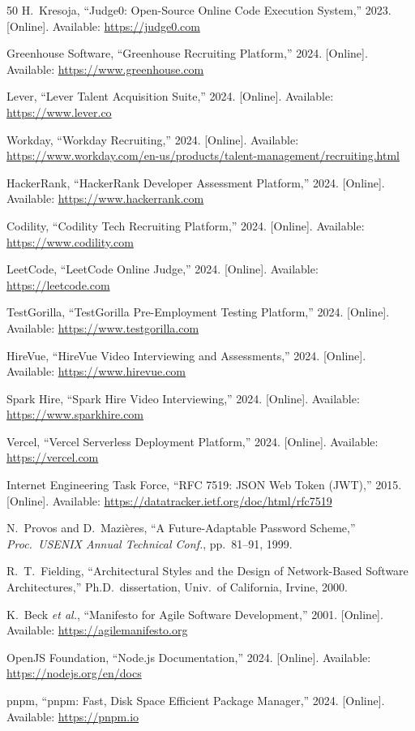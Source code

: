 \begin{thebibliography}{50}
H.~Kresoja, ``Judge0: Open-Source Online Code Execution System,'' 2023. [Online]. Available: \url{https://judge0.com}

Greenhouse Software, ``Greenhouse Recruiting Platform,'' 2024. [Online]. Available: \url{https://www.greenhouse.com}

Lever, ``Lever Talent Acquisition Suite,'' 2024. [Online]. Available: \url{https://www.lever.co}

Workday, ``Workday Recruiting,'' 2024. [Online]. Available: \url{https://www.workday.com/en-us/products/talent-management/recruiting.html}

HackerRank, ``HackerRank Developer Assessment Platform,'' 2024. [Online]. Available: \url{https://www.hackerrank.com}

Codility, ``Codility Tech Recruiting Platform,'' 2024. [Online]. Available: \url{https://www.codility.com}

LeetCode, ``LeetCode Online Judge,'' 2024. [Online]. Available: \url{https://leetcode.com}

TestGorilla, ``TestGorilla Pre-Employment Testing Platform,'' 2024. [Online]. Available: \url{https://www.testgorilla.com}

HireVue, ``HireVue Video Interviewing and Assessments,'' 2024. [Online]. Available: \url{https://www.hirevue.com}

Spark Hire, ``Spark Hire Video Interviewing,'' 2024. [Online]. Available: \url{https://www.sparkhire.com}

Vercel, ``Vercel Serverless Deployment Platform,'' 2024. [Online]. Available: \url{https://vercel.com}

Internet Engineering Task Force, ``RFC 7519: JSON Web Token (JWT),'' 2015. [Online]. Available: \url{https://datatracker.ietf.org/doc/html/rfc7519}

N.~Provos and D.~Mazi\`{e}res, ``A Future-Adaptable Password Scheme,'' \textit{Proc.\ USENIX Annual Technical Conf.}, pp.~81--91, 1999.

R.~T.~Fielding, ``Architectural Styles and the Design of Network-Based Software Architectures,'' Ph.D.\ dissertation, Univ.\ of California, Irvine, 2000.

K.~Beck \textit{et al.}, ``Manifesto for Agile Software Development,'' 2001. [Online]. Available: \url{https://agilemanifesto.org}

OpenJS Foundation, ``Node.js Documentation,'' 2024. [Online]. Available: \url{https://nodejs.org/en/docs}

pnpm, ``pnpm: Fast, Disk Space Efficient Package Manager,'' 2024. [Online]. Available: \url{https://pnpm.io}

\end{thebibliography}
